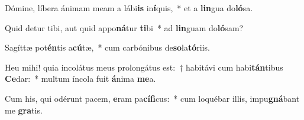 \item Dómine, líbera ánimam meam a lábi\textbf{is} in\textbf{í}quis,~* et a \textbf{lin}gua do\textbf{ló}sa.
\item Quid detur tibi, aut quid appo\textbf{ná}tur \textbf{ti}bi~* ad \textbf{lin}guam do\textbf{ló}sam?
\item Sagíttæ pot\textbf{én}tis a\textbf{cú}tæ,~* cum carbónibus de\textbf{so}la\textbf{tó}riis.
\item Heu mihi! quia incolátus meus prolongátus est:~† habitávi cum habi\textbf{tán}tibus \textbf{Ce}dar:~* multum íncola fuit \textbf{á}nima \textbf{me}a.
\item Cum his, qui odérunt pacem, \textbf{e}ram pa\textbf{cí}\textbf{fi}cus:~* cum loquébar illis, impu\textbf{gná}bant me \textbf{gra}tis.
